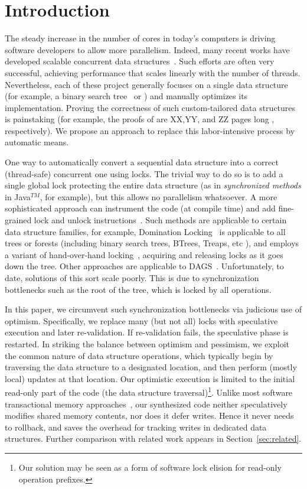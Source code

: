 \section{Introduction}

The steady increase in the number of  cores in today's computers is driving software developers to allow more parallelism. 
Indeed, many recent works have developed scalable concurrent data structures~\cite{bronson,dana,citrus,etc}. 
Such efforts are often very successful, achieving performance that scales linearly with the number of threads. 
Nevertheless, each of these project generally focuses on a single data structure 
(for example, a binary search tree~\cite{citrus} or ) and manually optimizes its implementation. 
Proving the correctness of such custom-tailored data structures is painstaking 
(for example, the proofs of \cite{x,y,z} are XX,YY, and ZZ pages long , respectively). 
We propose an approach to replace this labor-intensive process by automatic means.

One way to automatically convert a sequential data structure into a correct (thread-safe) concurrent one using locks. 
The trivial way to do so is to add a single global lock protecting the entire data structure 
(as in \emph{synchronized methods} in Java$^{TM}$, for example), but this allows no parallelism whatsoever. 
A more sophisticated approach can instrument the code (at compile time) and add fine-grained lock and unlock instructions~\cite{domination,tree-locking,dag,etc}. Such methods are applicable to certain data structure families, for example, Domination Locking~\cite{domination} is applicable to all trees or forests  (including binary search trees, BTrees, Treaps, etc ), and employs a variant of hand-over-hand locking~\cite{hand-over-hand}, acquiring and releasing locks as it goes down the tree.  Other approaches are applicable to DAGS~\cite{dag-locking}. Unfortunately, to date, solutions of this sort scale poorly. This is due to synchronization bottlenecks such as the root of the tree, which is locked by all operations.

In this paper, we circumvent such synchronization bottlenecks via judicious use of optimism. 
Specifically, we replace many (but not all) locks with speculative execution and later re-validation. 
If re-validation fails, the speculative phase is restarted. 
In striking the balance between optimism and pessimism, we exploit the common nature of data structure operations, 
which typically begin by traversing the data structure to a designated location, and then perform (mostly local) updates at that location. 
Our optimistic execution is limited to the initial read-only part of the code (the data structure traversal)\footnote{Our solution may be seen as a form of software lock elision for read-only operation prefixes.}. 
Unlike most software transactional memory approaches~\cite{stm,tls},  
our synthesized code neither speculatively modifies shared memory contents, nor does it defer writes. 
Hence it never needs to rollback, and saves the overhead for tracking writes in dedicated data structures. 
Further comparison with related work appears in Section~\ref{sec:related}.

